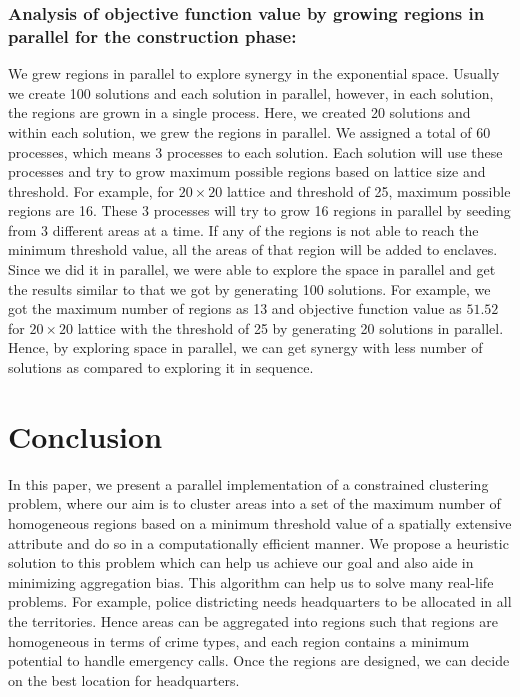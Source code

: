 \documentclass[conference]{IEEEtran}
\begin{document}
\subsubsection*{Analysis of objective function value by growing regions in parallel for the construction phase:}
We grew regions in parallel to explore synergy in the exponential space. Usually we create 100 solutions and each solution in parallel, however, in each solution, the regions are grown in a single process. Here, we created 20 solutions and within each solution, we grew the regions in parallel. We assigned a total of 60 processes, which means 3 processes to each solution. Each solution will use these processes and try to grow maximum possible regions based on lattice size and threshold. For example, for $20\times 20$ lattice and threshold of 25, maximum possible regions are 16. These 3 processes will try to grow 16 regions in parallel by seeding from 3 different areas at a time. If any of the regions is not able to reach the minimum threshold value, all the areas of that region will be added to enclaves. Since we did it in parallel, we were able to explore the space in parallel and get the results similar to that we got by generating 100 solutions. For example, we got the maximum number of regions as 13 and objective function value as $51.52$ for $20\times 20$ lattice with the threshold of 25 by generating 20 solutions in parallel. Hence, by exploring space in parallel, we can get synergy with less number of solutions as compared to exploring it in sequence.

\section{Conclusion}
In this paper, we present a parallel implementation of a constrained clustering
problem, where our aim is to cluster areas into a set of the maximum number of
homogeneous regions based on a minimum threshold value of a spatially extensive
attribute and do so in a computationally efficient manner. We propose a
heuristic solution to this problem which can help us achieve our goal and also
aide in minimizing aggregation bias. This algorithm can help us to solve many
real-life problems. For example, police districting needs headquarters to be
allocated in all the territories. Hence areas can be aggregated into regions
such that regions are homogeneous in terms of crime types, and each region
contains a minimum potential to handle emergency calls. Once the regions are
designed, we can decide on the best location for headquarters.
\end{document}
